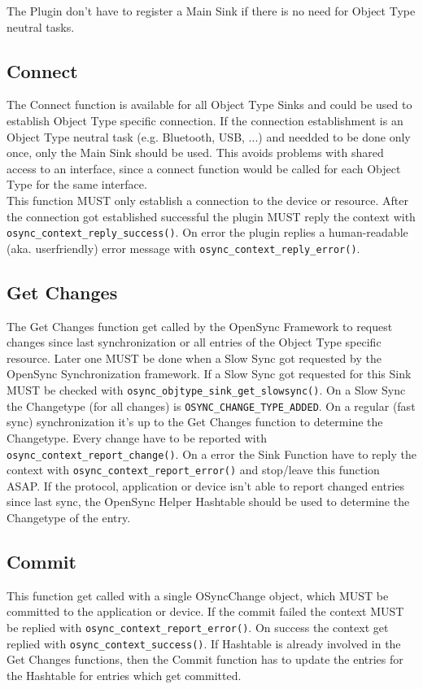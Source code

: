 The Plugin don't have to register a Main Sink if there is no need for Object 
Type neutral tasks.
\subsection{Connect}
The Connect function is available for all Object Type Sinks and could be used to
establish Object Type specific connection. If the connection establishment is an
Object Type neutral task (e.g. Bluetooth, USB, ...) and needded to be done only
once, only the Main Sink should be used. This avoids problems with shared access
to an interface, since a connect function would be called for each Object Type
for the same interface.\\
This function MUST only establish a connection to the device or resource. After
the connection got established successful the plugin MUST reply the context with
\verb|osync_context_reply_success()|. On error the plugin replies a 
human-readable
(aka. userfriendly) error message with \verb|osync_context_reply_error()|.
\subsection{Get Changes}
The Get Changes function get called by the OpenSync Framework to request changes
since last synchronization or all entries of the Object Type specific resource.
Later one MUST be done when a Slow Sync got requested by the OpenSync
Synchronization framework. If a Slow Sync got requested for this Sink MUST be
checked with \verb|osync_objtype_sink_get_slowsync()|. On a Slow Sync the 
Changetype (for all changes) is \verb|OSYNC_CHANGE_TYPE_ADDED|. On a regular 
(fast sync) synchronization it's up to the Get Changes function to determine 
the Changetype. Every change have to be reported with 
\verb|osync_context_report_change()|. On a error the Sink Function have to 
reply the context with \verb|osync_context_report_error()| and stop/leave this 
function ASAP. If the protocol, application or device isn't able to report 
changed entries since last sync, the OpenSync Helper Hashtable should be used 
to determine the Changetype of the entry.
\subsection{Commit}
This function get called with a single OSyncChange object, which MUST be
committed to the application or device. If the commit failed the context MUST be
replied with \verb|osync_context_report_error()|. On success the context get 
replied with \verb|osync_context_success()|. If Hashtable is already involved in
the Get Changes functions, then the Commit function has to update the entries 
for the Hashtable for entries which get committed.
